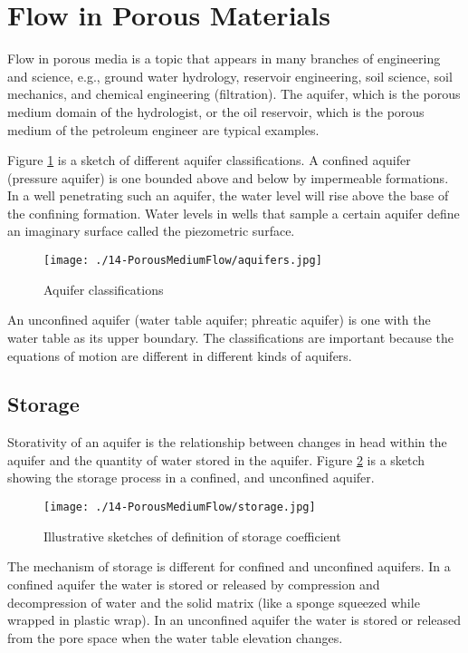 \section{Flow in Porous Materials}
Flow in porous media is a topic that appears in many branches of engineering and science, e.g., ground water hydrology, reservoir engineering, soil science, soil mechanics, and chemical engineering (filtration).
The aquifer, which is the porous medium domain of the hydrologist, or the oil reservoir, which is the porous medium of the petroleum engineer are typical examples.

Figure \ref{fig:aquifers} is a sketch of different aquifer classifications. 
A confined aquifer (pressure aquifer) is one bounded above and below by impermeable formations.
In a well penetrating such an aquifer, the water level will rise above the base of the confining formation.
Water levels in wells that sample a certain aquifer define an imaginary surface called the piezometric surface.

\begin{figure}[h!] %
   \centering
   \texttt{[image: ./14-PorousMediumFlow/aquifers.jpg]} 
   \caption{Aquifer classifications}
   \label{fig:aquifers}
\end{figure}

An unconfined aquifer (water table aquifer; phreatic aquifer) is one with the water table as its upper boundary.
The classifications are important because the equations of motion are different in different kinds of aquifers.

\subsection{Storage}
Storativity of an aquifer is the relationship between changes in head within the aquifer and the quantity of water stored in the aquifer.
Figure \ref{fig:storage} is a sketch showing the storage process in a confined, and unconfined aquifer.
\begin{figure}[h!] %
   \centering
   \texttt{[image: ./14-PorousMediumFlow/storage.jpg]} 
   \caption{Illustrative sketches of definition of storage coefficient}
   \label{fig:storage}
\end{figure}
\newline
The mechanism of storage is different for confined and unconfined aquifers.
In a confined aquifer the water is stored or released by compression and decompression of water and the solid matrix (like a sponge squeezed while wrapped in plastic wrap).
In an unconfined aquifer the water is stored or released from the pore space when the water table elevation changes.

